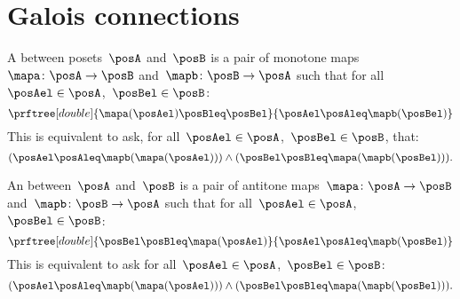 


\section{Galois connections}\label{subsec:galois-connections}

\begin{ctdefinition}
  A \emph{} between posets~$\posA$ and~$\posB$ is a pair of monotone maps~$\mapa\colon \posA\to \posB$ and~$\mapb\colon \posB\to \posA$ such that for all~$\posAel\in \posA$,~$\posBel\in \posB$:
  \begin{equation}
    \prftree[double]{\mapa(\posAel) \posBleq \posBel}{\posAel \posAleq \mapb(\posBel)}
  \end{equation}
  This is equivalent to ask, for all~$\posAel\in \posA$,~$\posBel\in \posB$, that:
  \begin{equation}
    (\posAel\posAleq \mapb(\mapa(\posAel))) \wedge (\posBel\posBleq \mapa(\mapb(\posBel))).
  \end{equation}
\end{ctdefinition}

\begin{ctdefinition}
  An \emph{} between~$\posA$ and~$\posB$ is a pair of antitone maps~$\mapa\colon \posA\to \posB$ and~$\mapb \colon \posB\to \posA$ such that for all~$\posAel\in \posA$,~$\posBel\in \posB$:
  \begin{equation}
    \prftree[double]{\posBel \posBleq \mapa(\posAel)}{\posAel \posAleq \mapb(\posBel)}
  \end{equation}
  This is equivalent to ask for all~$\posAel\in \posA$,~$\posBel\in \posB$:
  \begin{equation}
    (\posAel \posAleq \mapb(\mapa(\posAel)))\wedge  (\posBel \posBleq \mapa(\mapb(\posBel))).
  \end{equation}
\end{ctdefinition}

